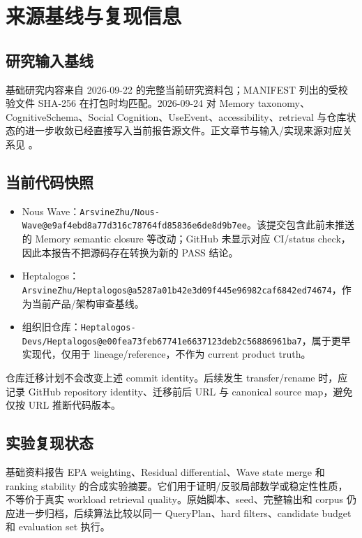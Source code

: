 \chapter{来源基线与复现信息}

\section{研究输入基线}

基础研究内容来自 2026-09-22 的完整当前研究资料包；MANIFEST 列出的受校验文件 SHA-256 在打包时均匹配。2026-09-24 对 Memory taxonomy、CognitiveSchema、Social Cognition、UseEvent、accessibility、retrieval 与仓库状态的进一步收敛已经直接写入当前报告源文件。正文章节与输入/实现来源对应关系见 。

\section{当前代码快照}

\begin{itemize}
\item Nous Wave：\texttt{ArsvineZhu/Nous-Wave@\allowbreak{}e9af4ebd\allowbreak{}8a77d316\allowbreak{}c78764fd\allowbreak{}85836e6d\allowbreak{}e8d9b7ee}。该提交包含此前未推送的 Memory semantic closure 等改动；GitHub 未显示对应 CI/status check，因此本报告不把源码存在转换为新的 PASS 结论。
\item Heptalogos：\texttt{ArsvineZhu/Heptalogos@\allowbreak{}a5287a01\allowbreak{}b42e3d09\allowbreak{}f445e969\allowbreak{}82caf684\allowbreak{}2ed74674}，作为当前产品/架构审查基线。
\item 组织旧仓库：\texttt{Heptalogos-Devs/Heptalogos@\allowbreak{}e00fea73\allowbreak{}feb67741\allowbreak{}e6637123\allowbreak{}deb2c568\allowbreak{}86961ba7}，属于更早实现代，仅用于 lineage/reference，不作为 current product truth。
\end{itemize}

仓库迁移计划不会改变上述 commit identity。后续发生 transfer/rename 时，应记录 GitHub repository identity、迁移前后 URL 与 canonical source map，避免仅按 URL 推断代码版本。

\section{实验复现状态}

基础资料报告 EPA weighting、Residual differential、Wave state merge 和 ranking stability 的合成实验摘要。它们用于证明/反驳局部数学或稳定性性质，不等价于真实 workload retrieval quality。原始脚本、seed、完整输出和 corpus 仍应进一步归档，后续算法比较以同一 QueryPlan、hard filters、candidate budget 和 evaluation set 执行。

